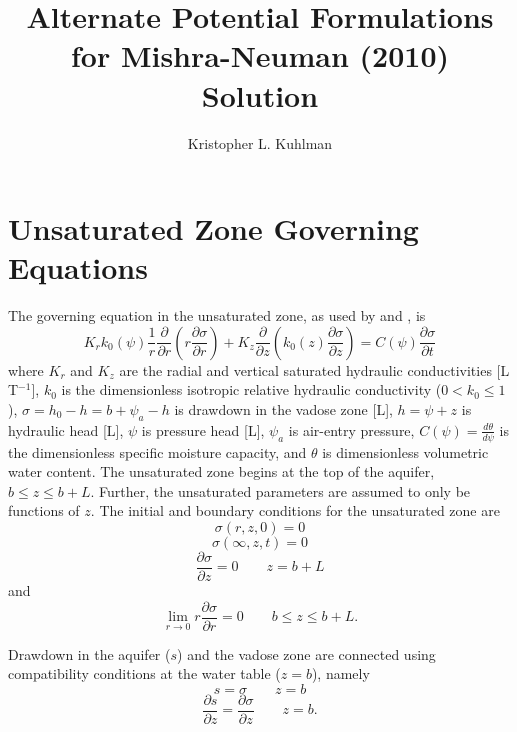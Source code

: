 \documentclass[12pt,letterpaper]{article}
\title{Alternate Potential Formulations for Mishra-Neuman (2010) Solution}
\author{Kristopher L. Kuhlman}
\begin{document}
\maketitle
\linenumbers
\section{Unsaturated Zone Governing Equations}
The governing equation in the unsaturated zone, as used by
\cite{mishra10} and \cite{tartakovsky07}, is
\begin{equation}
  \label{eq:unsatDim}
  K_r k_0(\psi) \frac{1}{r} \frac{\partial}{\partial r} \left( r\frac{\partial \sigma}{\partial r} \right) + K_z \frac{\partial}{\partial z} \left( k_0(z) \frac{\partial \sigma}{\partial z}\right) = C(\psi) \frac{\partial \sigma}{\partial t}
\end{equation}
where $K_r$ and $K_z$ are the radial and vertical saturated hydraulic
conductivities [L T$^{-1}$], $k_0$ is the dimensionless isotropic
relative hydraulic conductivity ($0 < k_0 \le 1$), $\sigma = h_0 - h =
b +\psi_a - h$ is drawdown in the vadose zone [L], $h=\psi+z$ is
hydraulic head [L], $\psi$ is pressure head [L], $\psi_a$ is air-entry
pressure, $C(\psi)=\frac{d\theta}{d \psi}$ is the dimensionless
specific moisture capacity, and $\theta$ is dimensionless volumetric
water content.  The unsaturated zone begins at the top of the aquifer,
$b \le z \le b+L$.  Further, the unsaturated parameters are assumed to
only be functions of $z$.  The initial and boundary conditions for the
unsaturated zone are
\begin{equation}\nonumber
\sigma(r,z,0) = 0
\end{equation}
\begin{equation}\nonumber
\sigma(\infty,z,t)=0
\end{equation}
\begin{equation}\nonumber
\frac{\partial \sigma}{\partial z}=0 \qquad z=b+L
\end{equation} and
\begin{equation}\nonumber
  \lim_{r \rightarrow 0} r \frac{\partial \sigma}{\partial r} = 0 \qquad b\le z \le b+L.
\end{equation}

Drawdown in the aquifer ($s$) and the vadose zone are connected using
compatibility conditions at the water table ($z=b$), namely
\begin{equation}\nonumber
s=\sigma \qquad z=b
\end{equation}
\begin{equation}\nonumber
\frac{\partial s}{\partial z}=\frac{\partial \sigma}{\partial z} \qquad z=b.
\end{equation}
\end{document}
